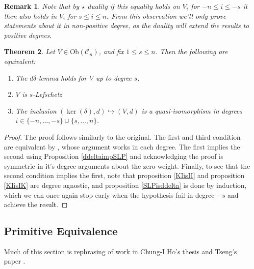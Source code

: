\documentclass{amsart}
\newtheorem{theorem}{Theorem}
\newtheorem{remark}[theorem]{Remark}
\theoremstyle{definition}
\begin{document}
\begin{remark}
    Note that by $\star$ duality if this equality holds on $V_i$ for $-n \leq i \leq -s$ it then also holds in $V_i$ for $s \leq i \leq n$. From this observation we'll only prove statements about it in non-positive degree, as the duality will extend the results to positive degrees.
\end{remark}

\begin{theorem} \label{WeakTheorem}
    Let $V \in \mathrm{Ob}(\mathscr{C}_n)$, and fix $1 \leq s \leq n$. Then the following are equivalent:
    \begin{enumerate}
        \item The $d\delta$-lemma holds for $V$ up to degree $s$.
        \item $V$ is $s$-Lefschetz
        \item The inclusion $(\ker(\delta),d) \hookrightarrow (V,d)$ is a quasi-isomorphism in degrees $i \in \{-n, \dots,-s\} \cup \{s ,\dots, n\}$.
    \end{enumerate}
\end{theorem}
\begin{proof}
The proof follows similarly to the original. The first and third condition are equivalent by \cite{manin1998constructions}, whose argument works in each degree. The first implies the second using Proposition \ref{ddeltaimpSLP} and acknowledging the proof is symmetric in it's degree arguments about the zero weight. Finally, to see that the second condition implies the first, note that proposition \ref{KIisII} and proposition \ref{KIisIK} are degree agnostic, and proposition \ref{SLPisddelta} is done by induction, which we can once again stop early when the hypothesis fail in degree $-s$ and achieve the result.
\end{proof}
\subsection{Primitive Equivalence}
Much of this section is rephrasing of work in Chung-I Ho's thesis \cite{HoSym} and Tseng's paper \cite{tseng2012cohomologyhodgetheorysymplectic}.
\end{document}
